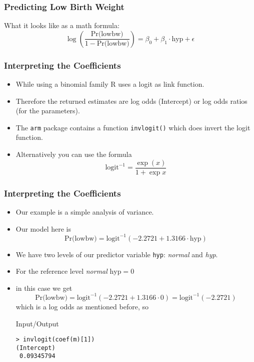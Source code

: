 \begin{frame}[fragile]\frametitle{Predicting Low Birth Weight}\footnotesize
What it looks like as a math formula:
$$ \log\left(\frac{\mbox{Pr(lowbw)}}{1-\mbox{Pr(lowbw)}}\right) = \beta_0 + \beta_1 \cdot \mbox{hyp} + \epsilon$$
\end{frame}


\begin{frame}[fragile]\frametitle{Interpreting the Coefficients}
\begin{itemize}
\item While using a binomial family R uses a logit as link function.
\item Therefore the returned estimates are log odds (Intercept) or log odds ratios (for the parameters). 
\item The \texttt{arm} package contains a function \texttt{invlogit()} which does invert the logit function. 
\item Alternatively you can use the formula $$ \mbox{logit}^{-1}= \frac{\exp(x)}{1+\exp{x}} $$
\end{itemize}
\end{frame}




\begin{frame}[fragile]\frametitle{Interpreting the Coefficients}
\begin{itemize}
\item Our example is a simple analysis of variance. 
\item Our model here is $$\mbox{Pr(lowbw)}=\mbox{logit}^{-1}(-2.2721 + 1.3166 \cdot \mbox{hyp})$$
\item We have two levels of our predictor variable \texttt{hyp}: \emph{normal} and \emph{hyp}. 
\item For the reference level \emph{normal} $\mbox{hyp}=0$ 
\item in this case we get \small $$\mbox{Pr(lowbw)}=\mbox{logit}^{-1}(-2.2721 + 1.3166 \cdot 0) = \mbox{logit}^{-1}(-2.2721)$$ which is a log odds as mentioned before, so 
  \begin{exampleblock}{Input/Output}
\begin{verbatim}
> invlogit(coef(m)[1]) 
(Intercept) 
 0.09345794 
\end{verbatim}
  \end{exampleblock}
\end{itemize}
\end{frame}

